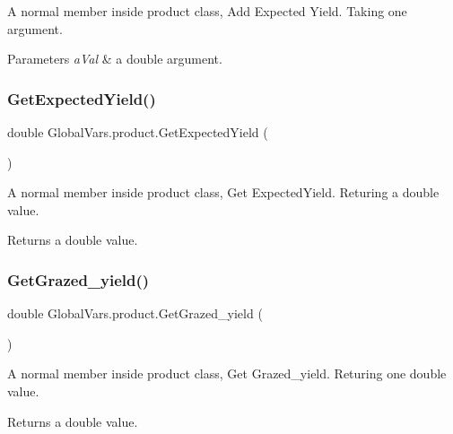 A normal member inside product class, Add Expected Yield. Taking one argument. 


\begin{DoxyParams}{Parameters}
{\em a\+Val} & a double argument. \\
\hline
\end{DoxyParams}
\mbox{\label{class_global_vars_1_1product_a6ee6e77e2269f3287020cb39a5781f6e}} 
\subsubsection{\texorpdfstring{GetExpectedYield()}{GetExpectedYield()}}
{\footnotesize\ttfamily double Global\+Vars.\+product.\+Get\+Expected\+Yield (\begin{DoxyParamCaption}{ }\end{DoxyParamCaption})\hspace{0.3cm}{\ttfamily [inline]}}



A normal member inside product class, Get Expected\+Yield. Returing a double value. 

\begin{DoxyReturn}{Returns}
a double value. 
\end{DoxyReturn}
\mbox{\label{class_global_vars_1_1product_affc6ccd9056f2c8d6bef17dc145e8e8a}} 
\subsubsection{\texorpdfstring{GetGrazed\_yield()}{GetGrazed\_yield()}}
{\footnotesize\ttfamily double Global\+Vars.\+product.\+Get\+Grazed\+\_\+yield (\begin{DoxyParamCaption}{ }\end{DoxyParamCaption})\hspace{0.3cm}{\ttfamily [inline]}}



A normal member inside product class, Get Grazed\+\_\+yield. Returing one double value. 

\begin{DoxyReturn}{Returns}
a double value. 
\end{DoxyReturn}
\mbox{\label{class_global_vars_1_1product_ac9b39f54bc2474e81629a98b3cb0008b}} 
